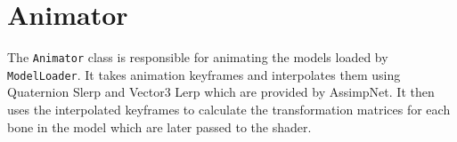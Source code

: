\section{Animator}

The \texttt{Animator} class is responsible for animating the models loaded by \texttt{ModelLoader}.
It takes animation keyframes and interpolates them using Quaternion Slerp and Vector3 Lerp which are provided by AssimpNet.
It then uses the interpolated keyframes to calculate the transformation matrices for each bone in the model which are later passed to the shader.